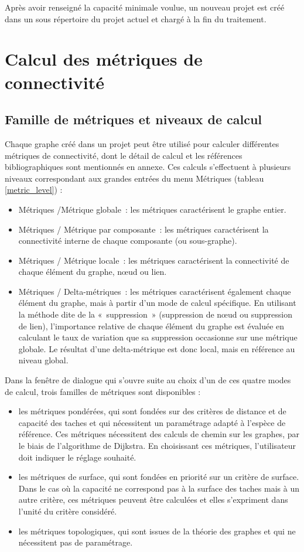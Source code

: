 \documentclass{article}
\begin{document}
Après avoir renseigné la capacité minimale voulue, un nouveau projet est créé dans un sous répertoire du projet actuel et chargé à la fin du traitement.

\section{Calcul des métriques de connectivité}

\subsection{Famille de métriques et niveaux de calcul}

Chaque graphe créé dans un projet peut être utilisé pour calculer différentes métriques de connectivité, dont le détail de calcul et les références bibliographiques sont mentionnés en annexe. Ces calculs s’effectuent à plusieurs niveaux correspondant aux grandes entrées du menu Métriques (tableau \ref{metric_level}) :
\begin{itemize}
	\item Métriques /Métrique globale~: les métriques caractérisent le graphe entier.
	\item Métriques / Métrique par composante~: les métriques caractérisent la connectivité interne de chaque composante (ou sous-graphe).
	\item Métriques / Métrique locale~: les métriques caractérisent la connectivité de chaque élément du graphe, nœud ou lien.
	\item Métriques / Delta-métriques~: les métriques caractérisent également chaque élément du graphe, mais à partir d’un mode de calcul spécifique. En utilisant la méthode dite de la «~suppression~» (suppression de nœud ou suppression de lien), l’importance relative de chaque élément du graphe est évaluée en calculant le taux de variation que sa suppression occasionne sur une métrique globale. Le résultat d’une delta-métrique est donc local, mais en référence au niveau global.
\end{itemize}

Dans la fenêtre de dialogue qui s’ouvre suite au choix d’un de ces quatre modes de calcul, trois familles de métriques sont disponibles :
\begin{itemize}
	\item les métriques pondérées, qui sont fondées sur des critères de distance et de capacité des taches et qui nécessitent un paramétrage adapté à l’espèce de référence. Ces métriques nécessitent des calculs de chemin sur les graphes, par le biais de l’algorithme de Dijkstra. En choisissant ces métriques, l’utilisateur doit indiquer le réglage souhaité.
	\item les métriques de surface, qui sont fondées en priorité sur un critère de surface. Dans le cas où la capacité ne correspond pas à la surface des taches mais à un autre critère, ces métriques peuvent être calculées et elles s’expriment dans l’unité du critère considéré. 
	\item les métriques topologiques, qui sont issues de la théorie des graphes et qui ne nécessitent pas de paramétrage.
\end{itemize}
\end{document}
